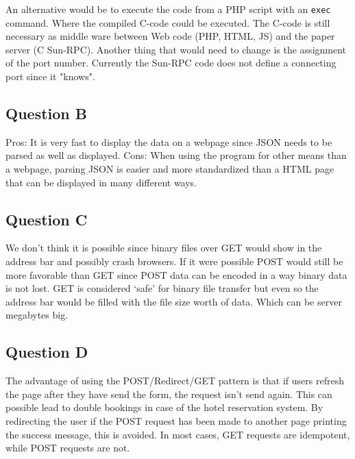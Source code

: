 \documentclass[11pt]{article}
\begin{document}
An alternative would be to execute the code from a PHP script with an \texttt{exec} command. Where the compiled C-code could be executed. The C-code is still necessary as middle ware between Web code (PHP, HTML, JS) and the paper server (C Sun-RPC). Another thing that would need to change is the assignment of the port number. Currently the Sun-RPC code does not define a connecting port since it "knows". 

\subsection{Question B}

Pros: It is very fast to display the data on a webpage since JSON needs to be parsed as well as displayed.
Cons: When using the program for other means than a webpage, parsing JSON is easier and more standardized than a HTML page that can be displayed in many different ways.

\subsection{Question C}

We don't think it is possible since binary files over GET would show in the address bar and possibly crash browsers. If it were possible POST would still be more favorable than GET since POST data can be encoded in a way binary data is not lost. GET is considered `safe' for binary file transfer but even so the address bar would be filled with the file size worth of data. Which can be server megabytes big.

\subsection{Question D}

The advantage of using the POST/Redirect/GET pattern is that if users refresh the page after they have send the form, the request isn't send again. This can possible lead to double bookings in case of the hotel reservation system. By redirecting the user if the POST request has been made to another page printing the success message, this is avoided. In most cases, GET requests are idempotent, while POST requests are not.
\end{document}
